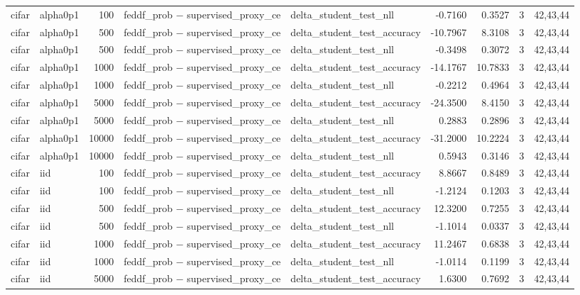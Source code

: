 \begin{tabular}{llrllrrrl}
cifar & alpha0p1 & 100 & feddf\_prob − supervised\_proxy\_ce & delta\_student\_test\_nll & -0.7160 & 0.3527 & 3 & 42,43,44 \\
cifar & alpha0p1 & 500 & feddf\_prob − supervised\_proxy\_ce & delta\_student\_test\_accuracy & -10.7967 & 8.3108 & 3 & 42,43,44 \\
cifar & alpha0p1 & 500 & feddf\_prob − supervised\_proxy\_ce & delta\_student\_test\_nll & -0.3498 & 0.3072 & 3 & 42,43,44 \\
cifar & alpha0p1 & 1000 & feddf\_prob − supervised\_proxy\_ce & delta\_student\_test\_accuracy & -14.1767 & 10.7833 & 3 & 42,43,44 \\
cifar & alpha0p1 & 1000 & feddf\_prob − supervised\_proxy\_ce & delta\_student\_test\_nll & -0.2212 & 0.4964 & 3 & 42,43,44 \\
cifar & alpha0p1 & 5000 & feddf\_prob − supervised\_proxy\_ce & delta\_student\_test\_accuracy & -24.3500 & 8.4150 & 3 & 42,43,44 \\
cifar & alpha0p1 & 5000 & feddf\_prob − supervised\_proxy\_ce & delta\_student\_test\_nll & 0.2883 & 0.2896 & 3 & 42,43,44 \\
cifar & alpha0p1 & 10000 & feddf\_prob − supervised\_proxy\_ce & delta\_student\_test\_accuracy & -31.2000 & 10.2224 & 3 & 42,43,44 \\
cifar & alpha0p1 & 10000 & feddf\_prob − supervised\_proxy\_ce & delta\_student\_test\_nll & 0.5943 & 0.3146 & 3 & 42,43,44 \\
cifar & iid & 100 & feddf\_prob − supervised\_proxy\_ce & delta\_student\_test\_accuracy & 8.8667 & 0.8489 & 3 & 42,43,44 \\
cifar & iid & 100 & feddf\_prob − supervised\_proxy\_ce & delta\_student\_test\_nll & -1.2124 & 0.1203 & 3 & 42,43,44 \\
cifar & iid & 500 & feddf\_prob − supervised\_proxy\_ce & delta\_student\_test\_accuracy & 12.3200 & 0.7255 & 3 & 42,43,44 \\
cifar & iid & 500 & feddf\_prob − supervised\_proxy\_ce & delta\_student\_test\_nll & -1.1014 & 0.0337 & 3 & 42,43,44 \\
cifar & iid & 1000 & feddf\_prob − supervised\_proxy\_ce & delta\_student\_test\_accuracy & 11.2467 & 0.6838 & 3 & 42,43,44 \\
cifar & iid & 1000 & feddf\_prob − supervised\_proxy\_ce & delta\_student\_test\_nll & -1.0114 & 0.1199 & 3 & 42,43,44 \\
cifar & iid & 5000 & feddf\_prob − supervised\_proxy\_ce & delta\_student\_test\_accuracy & 1.6300 & 0.7692 & 3 & 42,43,44 \\

\end{tabular}
